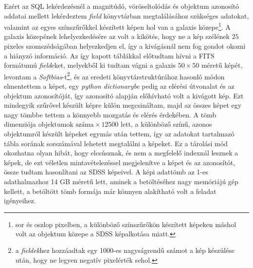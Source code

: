 \documentclass[12pt,letterpaper,oneside,openright]{book}
\begin{document}
 Ezért az SQL lekérdezésnél a magnitúdó, vöröseltolódás és objektum azonosító addatai mellett lekérdeztem \textit{field} könyvtárban megtalálásához szükséges adatokat, valamint az egyes színszűrőkkel készített képen hol van a galaxis közepe\footnote{sor és oszlop pixelben, a különböző színszűrőkön készített képeken  máshol volt az objektum közepe a SDSS képalkotása miatt.}. A galaxis közepének lehelyezkedésére az volt a kikötés, hogy ne a kép szélének $25$ pixeles szomszédságában helyezkedjen el, így a kivágásnál nem fog gondot okozni a hiányzó információ. Az így kapott táblákkal előtudtam hívni a FITS formátumú \textit{field}eket, melyekből ki tudtam vágni a galaxis $50\times 50$ méretű képét, levontam a \textit{Softbias}-t\footnote{a \textit{fieldek}hez hozzáadtak egy 1000-es nagyságrendű számot a kép készülése után, hogy ne legyen negatív pixelérték sehol.}, és az eredeti könyvtárstruktúrához hasonló módon elmentettem a képet, egy \textit{python dictionarybe} pedig az elérési útvonalat és az objektum azonosítóját, így azonosító alapján előhívható volt a kivágott kép. Ezt mindegyik szűrővel készült képre külön megcsináltam, majd az összes képet egy nagy tömbbe tettem a könnyebb mozgatás és elérés érdekében. A tömb dimenziója $\text{objektumok száma}\times \num{12500}$ lett, a különböző színű, azonos objektumról készült képeket egymás után tettem, így az adatokat tartalmazó tábla sorának sorszámával lehetett megtalálni a képeket. Ez a tárolási mód okozhatna olyan hibát, hogy elcsúsznak, és nem a megfelelő indexnál lesznek a képek, de ezt véletlen mintavételezéssel megjelenítve a képet és az azonosítót, össze tudtam hasonlítani az SDSS képeivel. A képi adattömb az 1-es adathalmazhoz 14 GB méretű lett,  aminek a betöltéséhez nagy memóriájú gép kellett, a betöltött tömb formája már könnyen alakítható volt a feladat igényeihez. %
 
 
\end{document}
